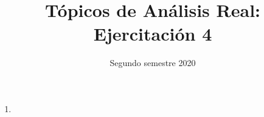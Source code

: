\documentclass[11pt]{article}
\title{ Tópicos de Análisis Real: Ejercitación 4}
\date{ Segundo semestre 2020 }
\begin{document}
\maketitle
\begin{enumerate}
  \item 
\end{enumerate}
\end{document}
